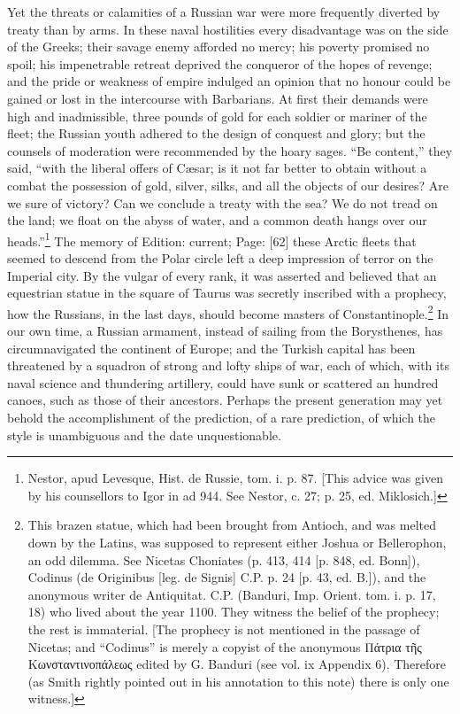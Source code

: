 Yet the threats or calamities of a Russian war were more frequently diverted by treaty than by arms. In these naval hostilities every disadvantage was on the side of the Greeks; their savage enemy afforded no mercy; his poverty promised no spoil; his impenetrable retreat deprived the conqueror of the hopes of revenge; and the pride or weakness of empire indulged an opinion that no honour could be gained or lost in the intercourse with Barbarians. At first their demands were high and inadmissible, three pounds of gold for each soldier or mariner of the fleet; the Russian youth adhered to the design of conquest and glory; but the counsels of moderation were recommended by the hoary sages. \texthebrew{“}Be content,\texthebrew{}” they said, \texthebrew{“}with the liberal offers of Cæsar; is it not far better to obtain without a combat the possession of gold, silver, silks, and all the objects of our desires? Are we sure of victory? Can we conclude a treaty with the sea? We do not tread on the land; we float on the abyss of water, and a common death hangs over our heads.\texthebrew{}”\footnote{Nestor, apud Levesque, Hist. de Russie, tom. i. p. 87. [This advice was given by his counsellors to Igor in ad 944. See Nestor, c. 27; p. 25, ed. Miklosich.]} The memory of Edition: current; Page: [62] these Arctic fleets that seemed to descend from the Polar circle left a deep impression of terror on the Imperial city. By the vulgar of every rank, it was asserted and believed that an equestrian statue in the square of Taurus was secretly inscribed with a prophecy, how the Russians, in the last days, should become masters of Constantinople.\footnote{This brazen statue, which had been brought from Antioch, and was melted down by the Latins, was supposed to represent either Joshua or Bellerophon, an odd dilemma. See Nicetas Choniates (p. 413, 414 [p. 848, ed. Bonn]), Codinus (de Originibus [leg. de Signis] C.P. p. 24 [p. 43, ed. B.]), and the anonymous writer de Antiquitat. C.P. (Banduri, Imp. Orient. tom. i. p. 17, 18) who lived about the year 1100. They witness the belief of the prophecy; the rest is immaterial. [The prophecy is not mentioned in the passage of Nicetas; and \texthebrew{“}Codinus\texthebrew{}” is merely a copyist of the anonymous \textgreek{Πάτρια τ\texthebrew{ῆ}ς Κωνσταντινοπάλεως} edited by G. Banduri (see vol. ix Appendix 6). Therefore (as Smith rightly pointed out in his annotation to this note) there is only one witness.]} In our own time, a Russian armament, instead of sailing from the Borysthenes, has circumnavigated the continent of Europe; and the Turkish capital has been threatened by a squadron of strong and lofty ships of war, each of which, with its naval science and thundering artillery, could have sunk or scattered an hundred canoes, such as those of their ancestors. Perhaps the present generation may yet behold the accomplishment of the prediction, of a rare prediction, of which the style is unambiguous and the date unquestionable.

